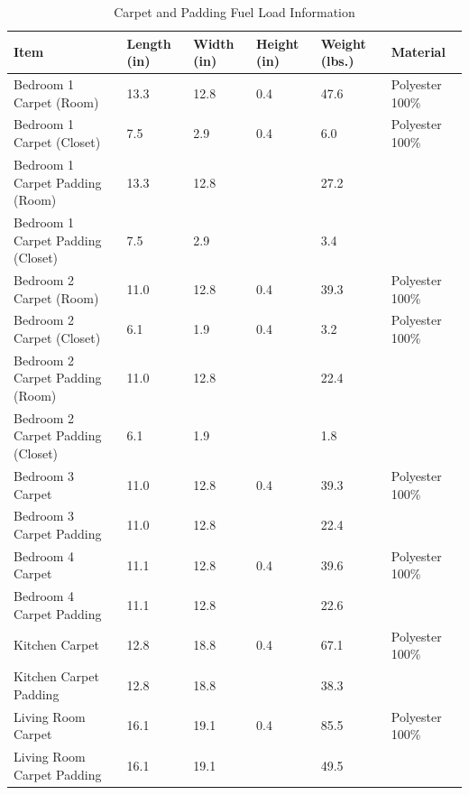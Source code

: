 \begin{table}[H]
\centering
\begin{tabular}{|L{0.23\textwidth}|C{0.08\textwidth}|C{0.08\textwidth}|C{0.08\textwidth}|C{0.08\textwidth}|L{0.25\textwidth}|}
\hline
Item 								&Length (in) 	&Width (in) 	&Height (in) 	&Weight (lbs.) 	&Material \\ \hline \hline
Bedroom 1 Carpet (Room) 			&13.3			&12.8			&0.4			&47.6			&Polyester 100\% \\ \hline
Bedroom 1 Carpet (Closet)			&7.5			&2.9			&0.4			&6.0			&Polyester 100\% \\ \hline
Bedroom 1 Carpet Padding (Room)		&13.3			&12.8			&				&27.2			& \\ \hline
Bedroom 1 Carpet Padding (Closet)	&7.5			&2.9			&				&3.4			& \\ \hline	 	 
Bedroom 2 Carpet (Room) 			&11.0			&12.8			&0.4			&39.3			&Polyester 100\% \\ \hline
Bedroom 2 Carpet (Closet)			&6.1			&1.9			&0.4			&3.2			&Polyester 100\% \\ \hline
Bedroom 2 Carpet Padding (Room)		&11.0			&12.8			&				&22.4			& \\ \hline
Bedroom 2 Carpet Padding (Closet)	&6.1			&1.9			&				&1.8			& \\ \hline	  
Bedroom 3 Carpet 					&11.0			&12.8			&0.4			&39.3			&Polyester 100\% \\ \hline
Bedroom 3 Carpet Padding 			&11.0			&12.8			&				&22.4			& \\ \hline	 
Bedroom 4 Carpet 					&11.1			&12.8			&0.4			&39.6			&Polyester 100\% \\ \hline
Bedroom 4 Carpet Padding 			&11.1			&12.8			&				&22.6			& \\ \hline	 
Kitchen Carpet 						&12.8			&18.8			&0.4			&67.1			&Polyester 100\% \\ \hline
Kitchen Carpet Padding 				&12.8			&18.8			&				&38.3			& \\ \hline	 
Living Room Carpet					&16.1			&19.1			&0.4			&85.5			&Polyester 100\% \\ \hline 
Living Room Carpet Padding 			&16.1			&19.1			&				&49.5			& \\ \hline	
\end{tabular}
\caption{Carpet and Padding Fuel Load Information}
\label{table:carpet_padding_fuel_weights}
\end{table}
